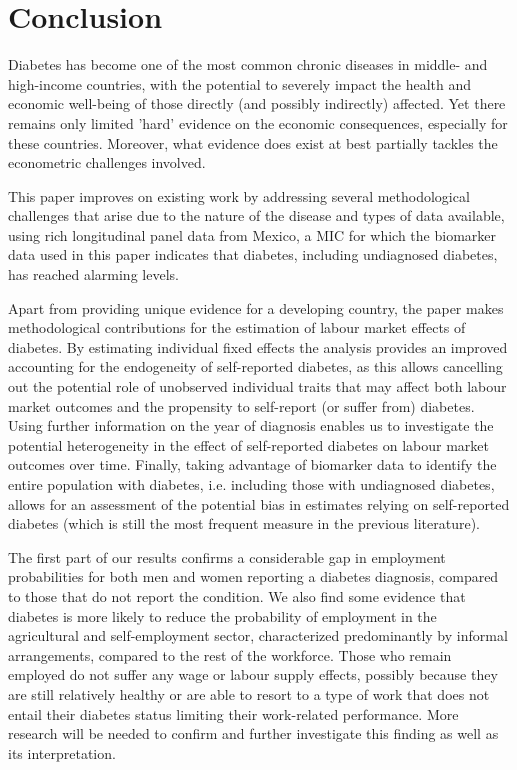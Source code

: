 \section{\label{sec:cha_4_conclusion}Conclusion}

Diabetes has become one of the most common chronic diseases in middle- and high-income countries, with the potential to severely impact the health and economic well-being of those directly (and possibly indirectly) affected. Yet there remains only limited 'hard' evidence on the economic consequences, especially for these countries. Moreover, what evidence does exist at best partially tackles the econometric challenges involved. 

This paper improves on existing work by addressing several methodological challenges that arise due to the nature of the disease and types of data available, using rich longitudinal panel data from Mexico, a \ac{MIC} for which the biomarker data used in this paper indicates that diabetes, including undiagnosed diabetes, has reached alarming levels.

Apart from providing unique evidence for a developing country, the paper makes methodological contributions for the estimation of labour market effects of diabetes. By estimating individual fixed effects the analysis provides an improved accounting for the endogeneity of self-reported diabetes, as this allows cancelling out the potential role of unobserved individual traits that may affect both labour market outcomes and the propensity to self-report (or suffer from) diabetes. Using further information on the year of diagnosis enables us to investigate the potential heterogeneity in the effect of self-reported diabetes on labour market outcomes over time. Finally, taking advantage of biomarker data to identify the entire population with diabetes, i.e. including those with undiagnosed diabetes, allows for an assessment of the potential bias in estimates relying on self-reported diabetes (which is still the most frequent measure in the previous literature).

The first part of our results confirms a considerable gap in employment probabilities for both men and women reporting a diabetes diagnosis, compared to those that do not report the condition. We also find some evidence that diabetes is more likely to reduce the probability of employment in the agricultural and self-employment sector, characterized predominantly by informal arrangements, compared to the rest of the workforce. Those who remain employed do not suffer any wage or labour supply effects, possibly because they are still relatively healthy or are able to resort to a type of work that does not entail their diabetes status limiting their work-related performance. More research will be needed to confirm and further investigate this finding as well as its interpretation. 

